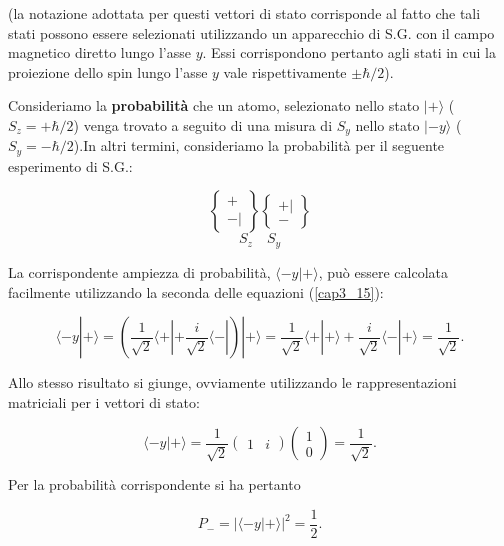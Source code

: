 \documentclass[a4paper,12pt,oneside]{book}
\begin{document}
(la notazione adottata per questi vettori di stato corrisponde al fatto che tali stati possono essere selezionati utilizzando un apparecchio di S.G. con il campo  magnetico diretto lungo l'asse $y$. Essi corrispondono pertanto agli stati in cui la proiezione dello spin lungo l'asse $y$ vale rispettivamente $\pm \hbar/2$).

Consideriamo la \textbf{probabilità} che un atomo, selezionato nello stato $| + \rangle$ ($S_z=+\hbar/2$) venga trovato a seguito di una misura di $S_y$ nello stato $| -y \rangle$ ($S_y=-\hbar/2$).In altri termini, consideriamo la probabilità per il seguente esperimento di S.G.:

\begin{equation}
\begin{Bmatrix}
 + \\ - |  
\end{Bmatrix}
\begin{Bmatrix}
 + | \\ -  
\end{Bmatrix}
\end{equation}
\begin{equation}
S_z \quad S_y
\end{equation}

La corrispondente ampiezza di probabilità, $\langle -y | + \rangle$, può essere calcolata facilmente utilizzando la seconda delle equazioni (\ref{cap3_15}):

\begin{equation}
\langle -y | + \rangle = \left( \frac{1}{\sqrt{2}}\langle + |  + \frac{i}{\sqrt{2}}\langle - |  \right ) |+ \rangle = \frac{1}{\sqrt{2}}\langle + | + \rangle +\frac{i}{\sqrt{2}}\langle - | + \rangle = \frac{1}{\sqrt{2}} .
\end{equation}

Allo stesso risultato si giunge, ovviamente utilizzando le rappresentazioni matriciali per i vettori di stato:

\begin{equation}
\langle -y | + \rangle= \frac{1}{\sqrt{2}}
\begin{pmatrix}
1 & i
\end{pmatrix}
\begin{pmatrix}
1 \\
0
\end{pmatrix}=
\frac{1}{\sqrt{2}} .
\end{equation}

Per la probabilità corrispondente si ha pertanto

\begin{equation}
P_-= |\langle -y | + \rangle |^2=\frac{1}{2} .
\end{equation}
\end{document}
